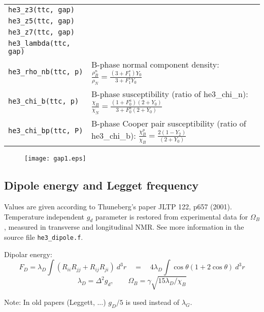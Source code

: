 \documentclass[a4paper]{article}
\begin{document}
\begin{tabular}{lp{11cm}}
\tt he3\_z3(ttc, gap) &\\
\tt he3\_z5(ttc, gap) &\\
\tt he3\_z7(ttc, gap) &\\
\tt he3\_lambda(ttc, gap) &\\

\tt he3\_rho\_nb(ttc, p)     &B-phase normal component density:
                             $\displaystyle \frac{\rho_B^n}{\rho_{N}} =
                               \frac{(3 + F_1^s) Y_0}{3 + F_1^s Y_0}$\\[3mm]
\tt he3\_chi\_b(ttc, p)      &B-phase susceptibility (ratio of he3\_chi\_n):
                             $\displaystyle \frac{\chi_B}{\chi_N} =
                               \frac{(1+F_0^a)(2 + Y_0)}
                                     {3+F_0^a(2 + Y_0)}$\\[3mm]
\tt he3\_chi\_bp(ttc, P)     &B-phase Cooper pair susceptibility (ratio of he3\_chi\_b):
                             $\displaystyle \frac{\chi^p_B}{\chi_B} =
                               \frac{2 (1-Y_2)}{(2 + Y_0)}$\\
\end{tabular}
\medskip

\begin{figure}[h]
\texttt{[image: gap1.eps]}\\
\end{figure}
\eject

\subsection*{Dipole energy and Legget frequency}

Values are given according to Thuneberg's paper JLTP 122, p657 (2001).
Temperature independent $g_d$ parameter is restored from experimental
data for $\Omega_B$, measured in transverse and longitudinal NMR.
See more information in the source file {\tt he3\_dipole.f}.

Dipolar energy:
$$
F_D = \lambda_D \int (R_{ii}R_{jj}+R_{ij}R_{ji})\ d^3r
\quad =\quad 4 \lambda_D \int \cos\theta(1+2\cos\theta)\ d^3r
$$
$$
\lambda_D = \Delta^2 g_d,
\qquad \Omega_B = \gamma \sqrt{15 \lambda_D/\chi_B}
$$

Note: In old papers (Leggett, ...) $g_D/5$ is used instead of $\lambda_G$.
\end{document}
